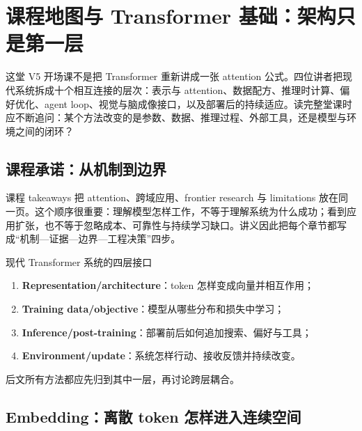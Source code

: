 \section{课程地图与 Transformer 基础：架构只是第一层}

这堂 V5 开场课不是把 Transformer 重新讲成一张 attention 公式。四位讲者把现代系统拆成十个相互连接的层次：表示与 attention、数据配方、推理时计算、偏好优化、agent loop、视觉与脑成像接口，以及部署后的持续适应。读完整堂课时应不断追问：某个方法改变的是参数、数据、推理过程、外部工具，还是模型与环境之间的闭环？



\subsection{课程承诺：从机制到边界}

课程 takeaways 把 attention、跨域应用、frontier research 与 limitations 放在同一页。这个顺序很重要：理解模型怎样工作，不等于理解系统为什么成功；看到应用扩张，也不等于忽略成本、可靠性与持续学习缺口。讲义因此把每个章节都写成“机制—证据—边界—工程决策”四步。




\begin{importantbox}{现代 Transformer 系统的四层接口}
\begin{enumerate}
  \item \textbf{Representation/architecture}：token 怎样变成向量并相互作用；
  \item \textbf{Training data/objective}：模型从哪些分布和损失中学习；
  \item \textbf{Inference/post-training}：部署前后如何追加搜索、偏好与工具；
  \item \textbf{Environment/update}：系统怎样行动、接收反馈并持续改变。
\end{enumerate}
后文所有方法都应先归到其中一层，再讨论跨层耦合。
\end{importantbox}

\subsection{Embedding：离散 token 怎样进入连续空间}

